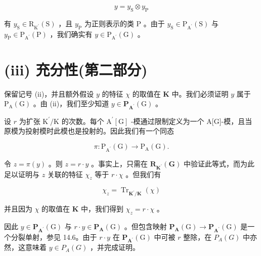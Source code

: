 \documentclass[10pt]{article}
\begin{document}
\[
y = {y}_{\mathrm{S}} \otimes  {y}_{\mathrm{P}}
\]

有 \({y}_{\mathrm{S}} \in  {\mathrm{R}}_{{\mathrm{K}}^{\prime }}\left( \mathrm{S}\right)\) ，且 \({y}_{\mathrm{P}}\) 为正则表示的类 \(\mathrm{P}\) 。由于 \({y}_{\mathrm{S}} \in  {\mathrm{P}}_{{\mathrm{A}}^{\prime }}\left( \mathrm{S}\right)\) 与 \({y}_{\mathrm{P}} \in  {\mathrm{P}}_{{\mathrm{A}}^{\prime }}\left( \mathrm{P}\right)\) ，我们确实有 \(y \in  {\mathrm{P}}_{{\mathrm{A}}^{\prime }}\left( \mathrm{G}\right)\) 。

\section*{(iii) 充分性(第二部分)}

保留记号 (ii)，并且额外假设 \(y\) 的特征 \(\chi\) 的取值在 \(\mathbf{K}\) 中。我们必须证明 \(y\) 属于 \({\mathrm{P}}_{\mathrm{A}}\left( \mathrm{G}\right)\) 。由 (ii)，我们至少知道 \(y \in  {\mathbf{P}}_{{\mathbf{A}}^{\prime }}\left( \mathrm{G}\right)\) 。

设 \(r\) 为扩张 \({\mathrm{K}}^{\prime }/\mathrm{K}\) 的次数。每个 \({\mathrm{A}}^{\prime }\left\lbrack  \mathrm{G}\right\rbrack\) -模通过限制定义为一个 A[G]-模，且当原模为投射模时此模也是投射的。因此我们有一个同态

\[
\pi  : {\mathrm{P}}_{{\mathrm{A}}^{\prime }}\left( \mathrm{G}\right)  \rightarrow  {\mathrm{P}}_{\mathrm{A}}\left( \mathrm{G}\right) .
\]

令 \(z = \pi \left( y\right)\) 。则 \(z = r \cdot  y\) 。事实上，只需在 \({\mathbf{R}}_{{\mathbf{K}}^{\prime }}\left( \mathbf{G}\right)\) 中验证此等式，而为此足以证明与 \(z\) 关联的特征 \({\chi }_{z}\) 等于 \(r \cdot  \chi\) 。但我们有

\[
{\chi }_{z} = {\operatorname{Tr}}_{{\mathbf{K}}^{\prime }/\mathbf{K}}\left( \chi \right)
\]

并且因为 \(\chi\) 的取值在 \(\mathbf{K}\) 中，我们得到 \({\chi }_{z} = r \cdot  \chi\) 。

因此 \(y \in  {\mathbf{P}}_{{\mathbf{A}}^{\prime }}\left( \mathrm{G}\right)\) 与 \(r \cdot  y \in  {\mathbf{P}}_{\mathbf{A}}\left( \mathrm{G}\right)\) 。但包含映射 \({\mathbf{P}}_{\mathbf{A}}\left( \mathrm{G}\right)  \rightarrow  {\mathbf{P}}_{{\mathbf{A}}^{\prime }}\left( \mathrm{G}\right)\) 是一个分裂单射，参见 14.6。由于 \(r \cdot  y\) 在 \({\mathbf{P}}_{{\mathbf{A}}^{\prime }}\left( \mathrm{G}\right)\) 中可被 \(r\) 整除，在 \({P}_{A}\left( G\right)\) 中亦然，这意味着 \(y \in  {P}_{A}\left( G\right)\) ，并完成证明。
\end{document}
